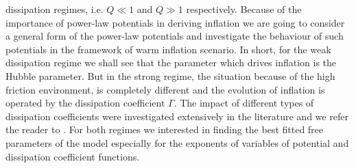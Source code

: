 \documentclass[12pt]{revtex4}
\begin{document}
dissipation regimes, i.e. $Q\ll 1$ and $Q\gg 1$ respectively. Because of the importance of power-law potentials in deriving inflation  we are going to consider a general form of the power-law potentials and investigate the behaviour of such  potentials in the framework of warm inflation scenario. {In short, for  the weak dissipation regime we shall see that  the parameter  which drives  inflation is the Hubble parameter.} But in the strong regime, the situation {because} of {the high friction environment}, is completely different and the evolution of inflation is operated by the dissipation coefficient $\Gamma$. The impact of different types of dissipation coefficients were investigated extensively in the literature  and we refer the reader to \cite{BasteroGil:2012cm,BasteroGil:2012cm1,Herrera:2015aja}. For both regimes we  interested in finding the best fitted free parameters of the model especially for  the exponents of variables of   potential and dissipation coefficient functions.
\end{document}
